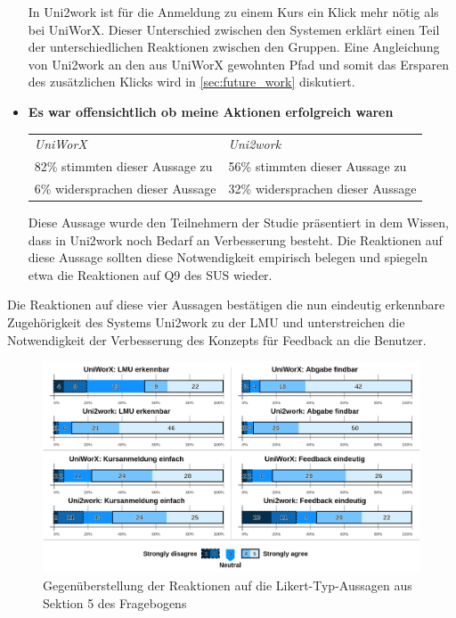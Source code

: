 \documentclass[11pt,a4paper,twoside,ngerman]{article}
\begin{document}
\begin{itemize}
    \smallskip
    In Uni2work ist für die Anmeldung zu einem Kurs ein Klick mehr nötig als bei UniWorX. Dieser Unterschied zwischen den Systemen erklärt einen Teil der unterschiedlichen Reaktionen zwischen den Gruppen. Eine Angleichung von Uni2work an den aus UniWorX gewohnten Pfad und somit das Ersparen des zusätzlichen Klicks wird in \autoref{sec:future_work} diskutiert.
    \item \textbf{Es war offensichtlich ob meine Aktionen erfolgreich waren}
    
    \smallskip
    \begin{tabular}{p{6.5cm}|p{6.5cm}}
        \textit{UniWorX} & \textit{Uni2work} \\
        82\% stimmten dieser Aussage zu & 56\% stimmten dieser Aussage zu \\
        6\% widersprachen dieser Aussage & 32\% widersprachen dieser Aussage
    \end{tabular}
    
    \smallskip
    Diese Aussage wurde den Teilnehmern der Studie präsentiert in dem Wissen, dass in Uni2work noch Bedarf an Verbesserung besteht. Die Reaktionen auf diese Aussage sollten diese Notwendigkeit empirisch belegen und spiegeln etwa die Reaktionen auf Q9 des SUS wieder.
\end{itemize}

\noindent
Die Reaktionen auf diese vier Aussagen bestätigen die nun eindeutig erkennbare Zugehörigkeit des Systems Uni2work zu der LMU und unterstreichen die Notwendigkeit der Verbesserung des Konzepts für Feedback an die Benutzer.

\begin{figure}[H]
    \centering
    \includegraphics[width=\textwidth]{images/spezifragen.jpg}
    \caption{Gegenüberstellung der Reaktionen auf die Likert-Typ-Aussagen aus Sektion 5 des Fragebogens}
    \label{fig:system-specific-likerts}
\end{figure}
\end{document}
